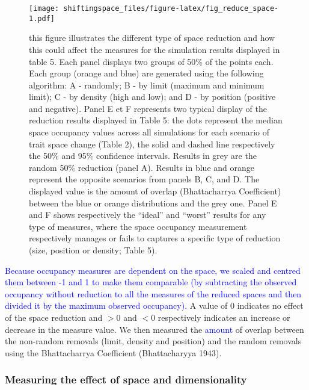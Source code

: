 \documentclass[]{article}
\begin{document}
\begin{figure}
\centering
\texttt{[image: shiftingspace\_files/figure-latex/fig\_reduce\_space-1.pdf]}
\caption{\small{this figure illustrates the different type of space
reduction and how this could affect the measures for the simulation
results displayed in table 5. Each panel displays two groups of 50\% of
the points each. Each group (orange and blue) are generated using the
following algorithm: A - randomly; B - by limit (maximum and minimum
limit); C - by density (high and low); and D - by position (positive and
negative). Panel E et F represents two typical display of the reduction
results displayed in Table 5: the dots represent the median space
occupancy values across all simulations for each scenario of trait space
change (Table 2), the solid and dashed line respectively the 50\% and
95\% confidence intervals. Results in grey are the random 50\% reduction
(panel A). Results in blue and orange represent the opposite scenarios
from panels B, C, and D. The displayed value is the amount of overlap
(Bhattacharrya Coefficient) between the blue or orange distributions and
the grey one. Panel E and F shows respectively the ``ideal'' and
``worst'' results for any type of measures, where the space occupancy
measurement respectively manages or fails to captures a specific type of
reduction (size, position or density; Table 5).}}
\end{figure}

\renewcommand\baselinestretch{1.6}\selectfont


\textcolor{blue}{Because occupancy measures are dependent on the space, we scaled and centred them between -1 and 1 to make them comparable (by subtracting the observed occupancy without reduction to all the measures of the reduced spaces and then divided it by the maximum observed occupancy).}
A value of 0 indicates no effect of the space reduction and \(>0\) and
\(<0\) respectively indicates an increase or decrease in the measure
value. We then measured the \textcolor{blue}{amount} of
overlap between the non-random removals (limit, density and position)
and the random removals using the Bhattacharrya Coefficient
(Bhattacharyya 1943).

\subsubsection{Measuring the effect of space and
dimensionality}\label{measuring-the-effect-of-space-and-dimensionality}
\end{document}
